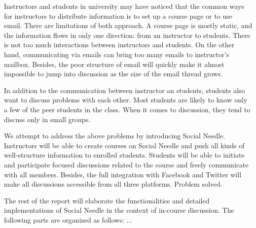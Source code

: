 Instructors and students in university may have noticed that the common ways for instructors to distribute information is to set up a course page or to use email. There are limitations of both approach. A course page is mostly static, and the information flows in only one direction: from an instructor to students. There is not too much interactions between instructors and students. On the other hand, communicating via emails can bring too many emails to instructor’s mailbox. Besides, the poor structure of email will quickly make it almost impossible to jump into discussion as the size of the email thread grows.

In addition to the communication between instructor an students, students also want to discuss problems with each other. Most students are likely to know only a few of the peer students in the class. When it comes to discussion, they tend to discuss only in small groups.

We attempt to address the above problems by introducing Social Needle. Instructors will be able to create courses on Social Needle and push all kinds of well-structure information to enrolled students. Students will be able to initiate and participate focused discussions related to the course and freely communicate with all members. Besides, the full integration with Facebook and Twitter will make all discussions accessible from all three platforms. Problem solved.   

The rest of the report will elaborate the functionalities and detailed implementations of Social Needle in the context of in-course discussion. The following parts are organized as follows: ...
